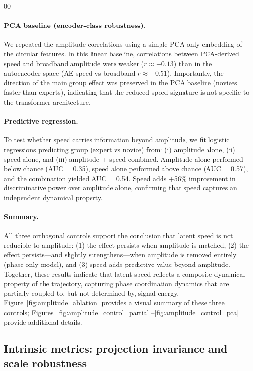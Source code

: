 \documentclass[5p,twocolumn,authoryear]{elsarticle}
\begin{document}
\begin{thebibliography}{00}
\paragraph{PCA baseline (encoder-class robustness).}
We repeated the amplitude correlations using a simple PCA-only embedding of the circular features. In this linear baseline, correlations between PCA-derived speed and broadband amplitude were weaker ($r\approx -0.13$) than in the autoencoder space (AE speed vs broadband $r\approx -0.51$). Importantly, the direction of the main group effect was preserved in the PCA baseline (novices faster than experts), indicating that the reduced-speed signature is not specific to the transformer architecture.

\paragraph{Predictive regression.}
To test whether speed carries information beyond amplitude, we fit logistic regressions predicting group (expert vs novice) from: (i) amplitude alone, (ii) speed alone, and (iii) amplitude + speed combined. Amplitude alone performed below chance (AUC = 0.35), speed alone performed above chance (AUC = 0.57), and the combination yielded AUC = 0.54. Speed adds +56\% improvement in discriminative power over amplitude alone, confirming that speed captures an independent dynamical property.

\paragraph{Summary.}
All three orthogonal controls support the conclusion that latent speed is not reducible to amplitude: (1) the effect persists when amplitude is matched, (2) the effect persists---and slightly strengthens---when amplitude is removed entirely (phase-only model), and (3) speed adds predictive value beyond amplitude. Together, these results indicate that latent speed reflects a composite dynamical property of the trajectory, capturing phase coordination dynamics that are partially coupled to, but not determined by, signal energy. Figure~\ref{fig:amplitude_ablation} provides a visual summary of these three controls; Figures~\ref{fig:amplitude_control_partial}--\ref{fig:amplitude_control_pca} provide additional details.

\subsection{Intrinsic metrics: projection invariance and scale robustness}
\label{app:intrinsic_metrics}


\end{thebibliography}
\end{document}
